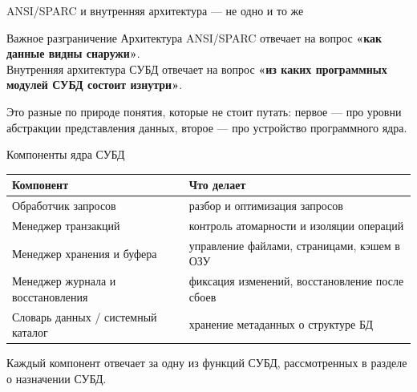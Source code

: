 \documentclass[aspectratio=169]{beamer}
\begin{document}
\begin{frame}{ANSI/SPARC и внутренняя архитектура — не одно и то же}

\begin{block}{Важное разграничение}
Архитектура ANSI/SPARC отвечает на вопрос
\textbf{«как данные видны снаружи»}.\\[4pt]
Внутренняя архитектура СУБД отвечает на вопрос
\textbf{«из каких программных модулей СУБД состоит изнутри»}.
\end{block}

\vspace{0.4cm}

Это разные по природе понятия, которые не стоит путать:
первое — про уровни абстракции представления данных,
второе — про устройство программного ядра.

\end{frame}


\begin{frame}{Компоненты ядра СУБД}

\small
\begin{table}
\centering
\begin{tabular}{p{}|p{}}
\toprule
\textbf{Компонент} & \textbf{Что делает}\\
\midrule
Обработчик запросов & разбор и оптимизация запросов\\
Менеджер транзакций & контроль атомарности и изоляции операций\\
Менеджер хранения и буфера & управление файлами, страницами, кэшем в ОЗУ\\
Менеджер журнала и восстановления & фиксация изменений, восстановление после сбоев\\
Словарь данных / системный каталог & хранение метаданных о структуре БД\\
\bottomrule
\end{tabular}
\end{table}

\vspace{0.3cm}
\footnotesize
Каждый компонент отвечает за одну из функций СУБД,
рассмотренных в разделе о назначении СУБД.

\end{frame}
\end{document}

